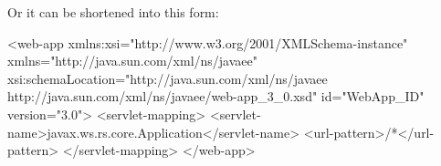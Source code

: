 Or it can be shortened into this form:

\begin{xmlcode}
<web-app xmlns:xsi="http://www.w3.org/2001/XMLSchema-instance"
        xmlns="http://java.sun.com/xml/ns/javaee"
        xsi:schemaLocation="http://java.sun.com/xml/ns/javaee http://java.sun.com/xml/ns/javaee/web-app_3_0.xsd"
        id="WebApp_ID" version="3.0">
    <servlet-mapping>
        <servlet-name>javax.ws.rs.core.Application</servlet-name>
        <url-pattern>/*</url-pattern>
    </servlet-mapping>
</web-app>
\end{xmlcode}